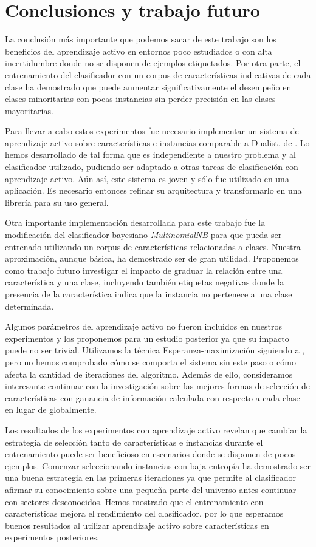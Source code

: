 
\chapter*{Conclusiones y trabajo futuro}

La conclusión más importante que podemos sacar de este trabajo son los beneficios del aprendizaje activo en entornos poco estudiados o con alta incertidumbre donde no se disponen de ejemplos etiquetados. Por otra parte, el entrenamiento del clasificador con un corpus de características indicativas de cada clase ha demostrado que puede aumentar significativamente el desempeño en clases minoritarias con pocas instancias sin perder precisión en las clases mayoritarias.

Para llevar a cabo estos experimentos fue necesario implementar un sistema de aprendizaje activo sobre características e instancias comparable a Dualist, de \citet{dualist}. Lo hemos desarrollado de tal forma que es independiente a nuestro problema y al clasificador utilizado, pudiendo ser adaptado a otras tareas de clasificación con aprendizaje activo. Aún así, este sistema es joven y sólo fue utilizado en una aplicación. Es necesario entonces refinar su arquitectura y transformarlo en una librería para su uso general.

Otra importante implementación desarrollada para este trabajo fue la modificación del clasificador bayesiano \textit{MultinomialNB} para que pueda ser entrenado utilizando un corpus de características relacionadas a clases. Nuestra aproximación, aunque básica, ha demostrado ser de gran utilidad. Proponemos como trabajo futuro investigar el impacto de graduar la relación entre una característica y una clase, incluyendo también etiquetas negativas donde la presencia de la característica indica que la instancia no pertenece a una clase determinada.

Algunos parámetros del aprendizaje activo no fueron incluidos en nuestros experimentos y los proponemos para un estudio posterior ya que su impacto puede no ser trivial. Utilizamos la técnica Esperanza-maximización siguiendo a \citet{dualist}, pero no hemos comprobado cómo se comporta el sistema sin este paso o cómo afecta la cantidad de iteraciones del algoritmo. Además de ello, consideramos interesante continuar con la investigación sobre las mejores formas de selección de características con ganancia de información calculada con respecto a cada clase en lugar de globalmente.

Los resultados de los experimentos con aprendizaje activo revelan que cambiar la estrategia de selección tanto de características e instancias durante el entrenamiento puede ser beneficioso en escenarios donde se disponen de pocos ejemplos. Comenzar seleccionando instancias con baja entropía ha demostrado ser una buena estrategia en las primeras iteraciones ya que permite al clasificador afirmar su conocimiento sobre una pequeña parte del universo antes continuar con sectores desconocidos. Hemos mostrado que el entrenamiento con características mejora el rendimiento del clasificador, por lo que esperamos buenos resultados al utilizar aprendizaje activo sobre características en experimentos posteriores.

